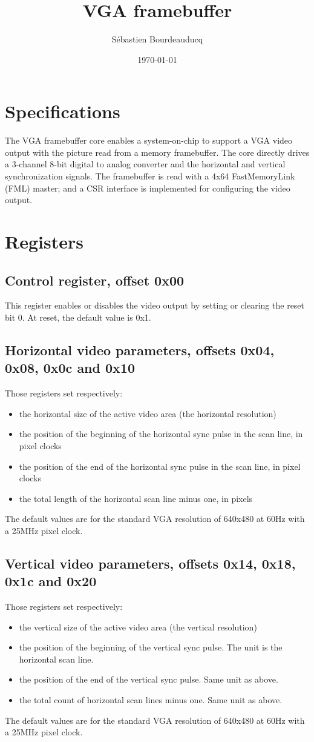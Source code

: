 \documentclass[a4paper,11pt]{article}
\title{VGA framebuffer}
\author{S\'ebastien Bourdeauducq}
\date{\today}
\begin{document}
\maketitle{}
\section{Specifications}
The VGA framebuffer core enables a system-on-chip to support a VGA video output with the picture read from a memory framebuffer.
The core directly drives a 3-channel 8-bit digital to analog converter and the horizontal and vertical synchronization signals.
The framebuffer is read with a 4x64 FastMemoryLink (FML) master; and a CSR interface is implemented for configuring the video output.

\section{Registers}
\subsection{Control register, offset 0x00}
This register enables or disables the video output by setting or clearing the reset bit 0. At reset, the default value is 0x1.

\subsection{Horizontal video parameters, offsets 0x04, 0x08, 0x0c and 0x10}
Those registers set respectively:
\begin{itemize}
\item the horizontal size of the active video area (the horizontal resolution)
\item the position of the beginning of the horizontal sync pulse in the scan line, in pixel clocks
\item the position of the end of the horizontal sync pulse in the scan line, in pixel clocks
\item the total length of the horizontal scan line minus one, in pixels
\end{itemize}
The default values are for the standard VGA resolution of 640x480 at 60Hz with a 25MHz pixel clock.

\subsection{Vertical video parameters, offsets 0x14, 0x18, 0x1c and 0x20}
Those registers set respectively:
\begin{itemize}
\item the vertical size of the active video area (the vertical resolution)
\item the position of the beginning of the vertical sync pulse. The unit is the horizontal scan line.
\item the position of the end of the vertical sync pulse. Same unit as above.
\item the total count of horizontal scan lines minus one. Same unit as above.
\end{itemize}
The default values are for the standard VGA resolution of 640x480 at 60Hz with a 25MHz pixel clock.
\end{document}
